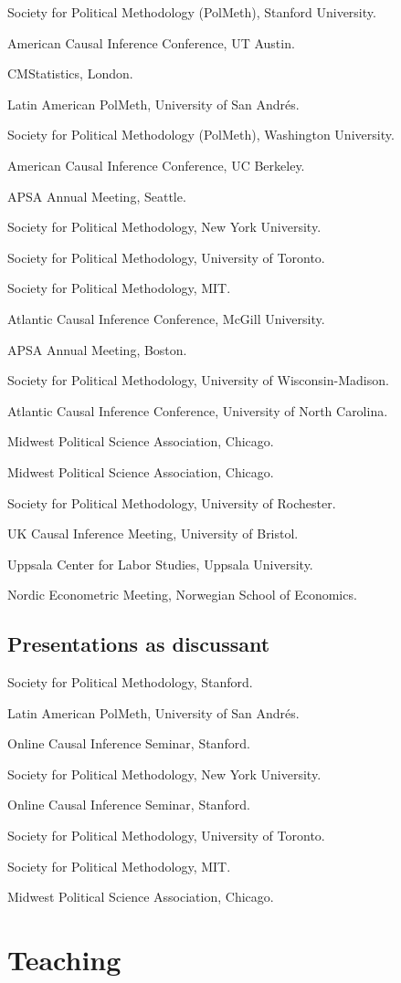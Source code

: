 \documentclass[10pt,letterpaper]{article}
\newenvironment{singledatelist}{
	\begin{list}{}{
		\setlength{\parskip}{0pt}
		\setlength{\itemsep}{4pt}
		\setlength{\parsep}{0.3em}
		\setlength{\leftmargin}{3.5em}
		\setlength{\labelwidth}{3.5em}
		\setlength{\labelsep}{1.5em}
		}
	}{
\end{list}
}
\newcommand{\dateitem}[2][]{\item[{#1}] {#2}}
\begin{document}
	\begin{singledatelist}
		\dateitem[2023]{Society for Political Methodology (PolMeth), Stanford University.}
		\dateitem{American Causal Inference Conference, UT Austin.}
		\dateitem[2022]{CMStatistics, London.}
		\dateitem{Latin American PolMeth, University of San Andrés.}
		\dateitem{Society for Political Methodology (PolMeth), Washington University.}
		\dateitem{American Causal Inference Conference, UC Berkeley.}
		\dateitem[2021]{APSA Annual Meeting, Seattle.}
		\dateitem{Society for Political Methodology, New York University.}
		\dateitem[2020]{Society for Political Methodology, University of Toronto.}
		\dateitem[2019]{Society for Political Methodology, MIT.}
		\dateitem{Atlantic Causal Inference Conference, McGill University.}
		\dateitem[2018]{APSA Annual Meeting, Boston.}
		\dateitem[2017]{Society for Political Methodology, University of Wisconsin-Madison.}
		\dateitem{Atlantic Causal Inference Conference, University of North Carolina.}
		\dateitem{Midwest Political Science Association, Chicago.}
		\dateitem[2016]{Midwest Political Science Association, Chicago.}
		\dateitem[2015]{Society for Political Methodology, University of Rochester.}
		\dateitem{UK Causal Inference Meeting, University of Bristol.}
		\dateitem[2013]{Uppsala Center for Labor Studies, Uppsala University.}
		\dateitem{Nordic Econometric Meeting, Norwegian School of Economics.}
	\end{singledatelist}


	\subsection*{Presentations as discussant}

	\begin{singledatelist}
		\dateitem[2023]{Society for Political Methodology, Stanford.}
		\dateitem[2022]{Latin American PolMeth, University of San Andrés.}
		\dateitem{Online Causal Inference Seminar, Stanford.}
		\dateitem[2021]{Society for Political Methodology, New York University.}
		\dateitem{Online Causal Inference Seminar, Stanford.}
		\dateitem[2020]{Society for Political Methodology, University of Toronto.}
		\dateitem[2019]{Society for Political Methodology, MIT.}
		\dateitem[2017]{Midwest Political Science Association, Chicago.}
	\end{singledatelist}


	\section*{Teaching}
\end{document}
